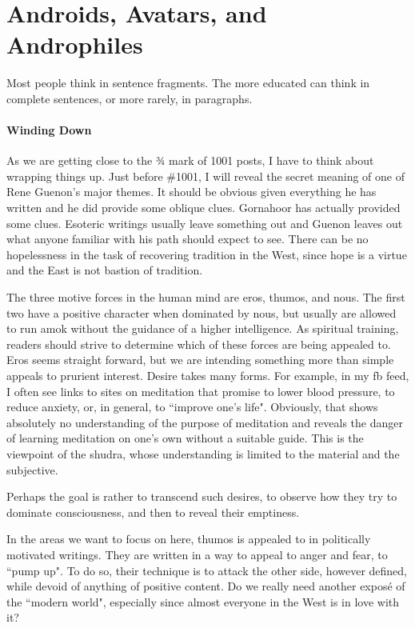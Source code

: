 \section{Androids, Avatars, and Androphiles}

Most people think in sentence fragments. The more educated can think in complete sentences, or more rarely, in paragraphs.

\paragraph{Winding Down}
As we are getting close to the ¾ mark of 1001 posts, I have to think about wrapping things up. Just before \#1001, I will reveal the secret meaning of one of Rene Guenon's major themes. It should be obvious given everything he has written and he did provide some oblique clues. Gornahoor has actually provided some clues. Esoteric writings usually leave something out and Guenon leaves out what anyone familiar with his path should expect to see. There can be no hopelessness in the task of recovering tradition in the West, since hope is a virtue and the East is not bastion of tradition.

The three motive forces in the human mind are eros, thumos, and nous. The first two have a positive character when dominated by nous, but usually are allowed to run amok without the guidance of a higher intelligence. As spiritual training, readers should strive to determine which of these forces are being appealed to. Eros seems straight forward, but we are intending something more than simple appeals to prurient interest. Desire takes many forms. For example, in my fb feed, I often see links to sites on meditation that promise to lower blood pressure, to reduce anxiety, or, in general, to ``improve one's life". Obviously, that shows absolutely no understanding of the purpose of meditation and reveals the danger of learning meditation on one's own without a suitable guide. This is the viewpoint of the shudra, whose understanding is limited to the material and the subjective.

Perhaps the goal is rather to transcend such desires, to observe how they try to dominate consciousness, and then to reveal their emptiness.

In the areas we want to focus on here, thumos is appealed to in politically motivated writings. They are written in a way to appeal to anger and fear, to ``pump up". To do so, their technique is to attack the other side, however defined, while devoid of anything of positive content. Do we really need another exposé of the ``modern world", especially since almost everyone in the West is in love with it?

